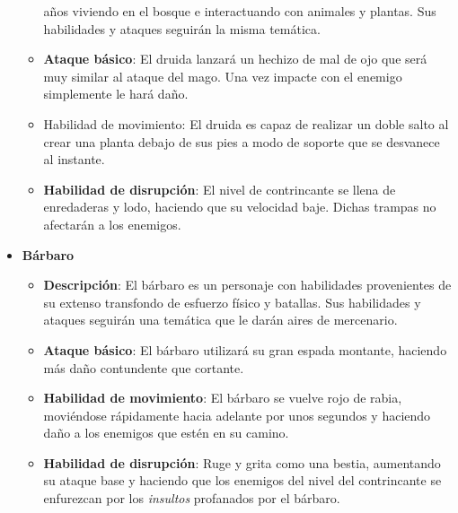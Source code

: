 \begin{itemize}
\begin{itemize}
        años viviendo en el bosque e interactuando con animales y plantas. Sus
        habilidades y ataques seguirán la misma temática.
        \item \textbf{Ataque básico}: El druida lanzará un hechizo de mal de ojo que será
        muy similar al ataque del mago. Una vez impacte con el enemigo
        simplemente le hará daño.
        \item Habilidad de movimiento: El druida es capaz de realizar un doble
        salto al crear una planta debajo de sus pies a modo de soporte que se
        desvanece al instante.
        \item \textbf{Habilidad de disrupción}: El nivel de contrincante se llena de
        enredaderas y lodo, haciendo que su velocidad baje. Dichas trampas no
        afectarán a los enemigos.
    \end{itemize}
    \item \textbf{Bárbaro}  %
    \begin{itemize}
        \item \textbf{Descripción}: El bárbaro es un personaje con habilidades
        provenientes de su extenso transfondo de esfuerzo físico y batallas. Sus
        habilidades y ataques seguirán una temática que le darán aires de
        mercenario.
        \item \textbf{Ataque básico}: El bárbaro utilizará su gran espada montante,
        haciendo más daño contundente que cortante.
        \item \textbf{Habilidad de movimiento}: El bárbaro se vuelve rojo de rabia,
        moviéndose rápidamente hacia adelante por unos segundos y haciendo daño
        a los enemigos que estén en su camino.
        \item \textbf{Habilidad de disrupción}: Ruge y grita como una bestia, aumentando
        su ataque base y haciendo que los enemigos del nivel del contrincante se
        enfurezcan por los \textit{insultos} profanados por el bárbaro.
    \end{itemize}
\end{itemize}